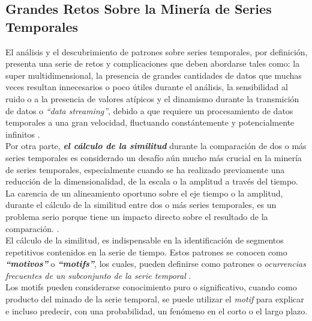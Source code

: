 \subsection{Grandes Retos Sobre la Miner\'ia de Series Temporales}
El an\'alisis y el descubrimiento de patrones sobre series temporales, por definici\'on, presenta una serie de retos y complicaciones que deben abordarse tales como: la super multidimensional, la presencia de grandes cantidades de datos que muchas veces resultan innecesarios o poco \'utiles durante el an\'alisis, la sensibilidad al ruido o a la presencia de valores at\'ipicos y el dinamismo durante la transmici\'on de datos o \textit{\enquote{data streaming}}, debido a que requiere un procesamiento de datos temporales a una gran velocidad, fluctuando const\'antemente y potencialmente infinitos \cite{main}.\\
Por otra parte, \textit{\textbf{el c\'alculo de la similitud}} durante la comparaci\'on de dos o m\'as series temporales es considerado un desaf\'io a\'un mucho m\'as crucial en la miner\'ia de series temporales, especialmente cuando se ha realizado previamente una reducci\'on de la dimensionalidad, de la escala o la amplitud a trav\'es del tiempo. La carencia de un alineamiento oportuno sobre el eje tiempo o la amplitud, durante el c\'alculo de la similitud entre dos o m\'as series temporales, es un problema serio porque tiene un impacto directo sobre el resultado de la comparaci\'on. \cite{concepts}.\\
El c\'alculo de la similitud, es indispensable en la identificaci\'on de segmentos repetitivos contenidos en la serie de tiempo. Estos patrones se conocen como \textit{\textbf{\enquote{motivos}}} o \textit{\textbf{\enquote{motifs}}}, los cuales, pueden definirse como patrones o \textit{ocurrencias frecuentes de un subconjunto de la serie temporal} \cite{main}.\\
Los motifs pueden considerarse conocimiento puro o significativo, cuando como producto del minado de la serie temporal, se puede utilizar el \textit{motif} para explicar e incluso predecir, con una probabilidad, un fen\'omeno en el corto o el largo plazo.
